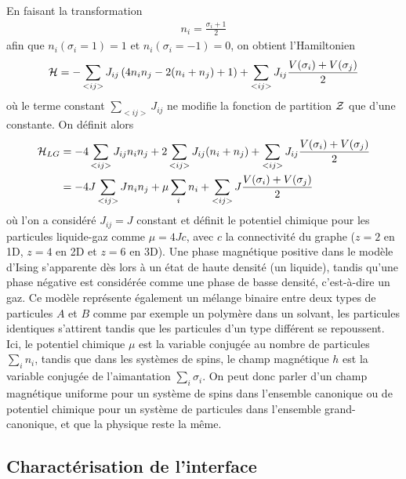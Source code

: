 En faisant la transformation\cite{goldenfeld_lectures_2018} 
\begin{align}
    n_i =  \frac{\sigma_i +1}{2}
\end{align}
afin que $n_i(\sigma_i = 1) = 1$ et $n_i(\sigma_i = -1) = 0$, on obtient l'Hamiltonien
\begin{equation}
	\mathcal{H} =  - \sum_{< i j >}  J_{ij} \left( 4 n_i n_j -2 ( n_i+n_j) + 1 \right)+ \sum_{< i j >}  J_{ij} \frac{V(\sigma_i)+V(\sigma_j)}{2}  
\end{equation}
où le terme constant $\sum_{< i j >}  J_{ij}$ ne modifie la fonction de partition $\mathcal{Z}$ que d'une constante. On définit alors 
\begin{align}
	\mathcal{H}_{LG} &=  - 4 \sum_{< i j >}  J_{ij}  n_i n_j  + 2 \sum_{< i j >}  J_{ij}  (n_i+n_j) + \sum_{< i j >}  J_{ij} \frac{V(\sigma_i)+V(\sigma_j)}{2}  \nonumber \\
       &=  - 4 J \sum_{< i j >}  J n_i n_j  + \mu \sum_i  n_i + \sum_{< i j >}  J \frac{V(\sigma_i)+V(\sigma_j)}{2}  
\end{align}
où l'on a considéré $J_{ij} = J$ constant et définit le potentiel chimique pour les particules liquide-gaz comme $\mu=4Jc$, avec $c$ la connectivité du graphe ($z=2$ en 1D, $z=4$ en 2D et $z=6$ en 3D). Une phase magnétique positive dans le modèle d'Ising s'apparente dès lors à un état de haute densité (un liquide), tandis qu'une phase négative est considérée comme une phase de basse densité, c'est-à-dire un gaz.
Ce modèle représente également un mélange binaire entre deux types de particules $A$ et $B$ comme par exemple un polymère dans un solvant, les particules identiques s'attirent tandis que les particules d'un type différent se repoussent. 
Ici, le potentiel chimique $\mu$ est la variable conjugée au nombre de particules $\sum_i n_i$, tandis que dans les systèmes de spins, le champ magnétique $h$ est la variable conjugée de l'aimantation $\sum_i \sigma_i$.
On peut donc parler d'un champ magnétique uniforme pour un système de spins dans l'ensemble canonique ou de potentiel chimique pour un système de particules dans l'ensemble grand-canonique, et que la physique reste la même. 

    \subsection{Charactérisation de l'interface}

